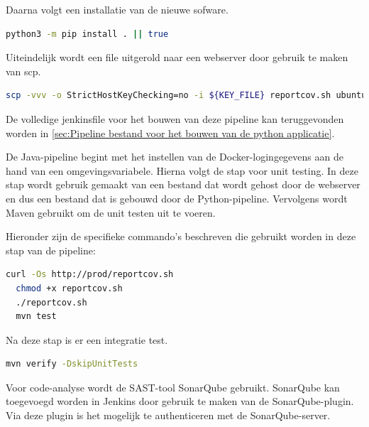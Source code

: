\vspace{0.5cm}
Daarna volgt een installatie van de nieuwe sofware.
\newline

\begin{lstlisting}[language=bash, style=bashstyle]
python3 -m pip install . || true
\end{lstlisting}

\vspace{0.5cm}
Uiteindelijk wordt een file uitgerold naar een webserver door gebruik te maken van scp.
\newline

\begin{lstlisting}[language=bash, style=bashstyle]
  scp -vvv -o StrictHostKeyChecking=no -i ${KEY_FILE} reportcov.sh ubuntu@192.168.19.71:/var/www/ 
\end{lstlisting}

\vspace{0.5cm}
De volledige jenkinsfile voor het bouwen van deze pipeline kan teruggevonden worden in \ref{sec:Pipeline bestand voor het bouwen van de python applicatie}.
\newline

De Java-pipeline begint met het instellen van de Docker-logingegevens aan de hand van een omgevingsvariabele. Hierna volgt de stap voor unit testing. In deze stap wordt gebruik gemaakt van een bestand dat wordt gehost door de webserver en dus een bestand dat is gebouwd door de Python-pipeline. Vervolgens wordt Maven gebruikt om de unit testen uit te voeren. 
\newline

Hieronder zijn de specifieke commando's beschreven die gebruikt worden in deze stap van de pipeline:
\newline

\begin{lstlisting}[language=bash, style=bashstyle]
  curl -Os http://prod/reportcov.sh
  chmod +x reportcov.sh
  ./reportcov.sh
  mvn test
\end{lstlisting}

\vspace{0.5cm}
Na deze stap is er een integratie test.
\newline

\begin{lstlisting}[language=bash, style=bashstyle]
  mvn verify -DskipUnitTests
\end{lstlisting}

\vspace{0.5cm}
Voor code-analyse wordt de SAST-tool SonarQube gebruikt. SonarQube kan toegevoegd worden in Jenkins door gebruik te maken van de SonarQube-plugin. Via deze plugin is het mogelijk te authenticeren met de SonarQube-server. 
\newline

